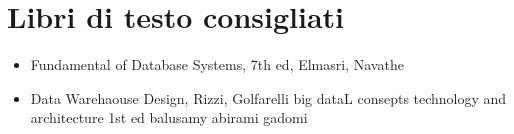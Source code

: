 
\section{Libri di testo consigliati}
\begin{itemize}
	\item Fundamental of Database Systems, 7th ed, Elmasri, Navathe
	\item Data Warehaouse Design, Rizzi, Golfarelli
big dataL consepts technology and architecture 1st ed balusamy abirami gadomi
\end{itemize}